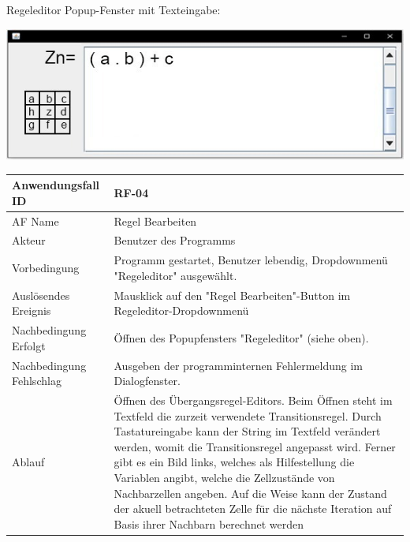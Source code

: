 \documentclass[11pt,a4paper]{article}
\begin{document}
	\pagebreak
	\par
	Regeleditor Popup-Fenster mit Texteingabe:
	\par
	\includegraphics[width=15cm]{regedit}
	\par
	\begin{tabular}[m]{|m{5cm}|m{11cm}|}
		\hline
		Anwendungsfall ID     & RF-04 \\ %
		\hline
		AF Name     &  Regel Bearbeiten \\
		\hline
		Akteur&Benutzer des Programms \\
		\hline
		Vorbedingung&Programm gestartet, Benutzer lebendig, Dropdownmenü "Regeleditor" ausgewählt.\\
		\hline
		Auslösendes Ereignis&Mausklick auf den "Regel Bearbeiten"-Button im Regeleditor-Dropdownmenü\\
		\hline
		Nachbedingung Erfolgt&Öffnen des Popupfensters "Regeleditor" (siehe oben).\\
		\hline
		Nachbedingung Fehlschlag&Ausgeben der programminternen Fehlermeldung im Dialogfenster.\\
		\hline
		Ablauf&Öffnen des Übergangsregel-Editors. Beim Öffnen steht im Textfeld die zurzeit verwendete Transitionsregel. Durch Tastatureingabe kann der String im Textfeld verändert werden, womit die Transitionsregel angepasst wird. Ferner gibt es ein Bild links, welches als Hilfestellung die Variablen angibt, welche die Zellzustände von Nachbarzellen angeben. Auf die Weise kann der Zustand der akuell betrachteten Zelle für die nächste Iteration auf Basis ihrer Nachbarn berechnet werden\\
		\hline
	\end{tabular}
	\par
	
\end{document}
